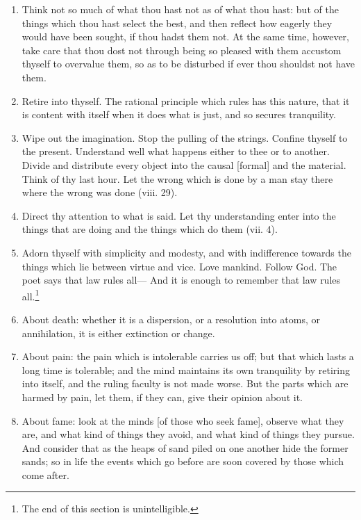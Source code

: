 \begin{enumerate}
\item Think not so much of what thou hast not as of what thou hast: but of the things which thou hast select the best, and then reflect how eagerly they would have been sought, if thou hadst them not. At the same time, however, take care that thou dost not through being so pleased with them accustom thyself to overvalue them, so as to be disturbed if ever thou shouldst not have them.

\item Retire into thyself. The rational principle which rules has this nature, that it is content with itself when it does what is just, and so secures tranquility.

\item Wipe out the imagination. Stop the pulling of the strings. Confine thyself to the present. Understand well what happens either to thee or to another. Divide and distribute every object into the causal [{\clarify formal}] and the material. Think of thy last hour. Let the wrong which is done by a man stay there where the wrong was done (viii. 29).

\item Direct thy attention to what is said. Let thy understanding enter into the things that are doing and the things which do them (vii. 4).

\item Adorn thyself with simplicity and modesty, and with indifference towards the things which lie between virtue and vice. Love mankind. Follow God. The poet says that law rules all— And it is enough to remember that law rules all.\footnote{The end of this section is unintelligible.}

\item About death: whether it is a dispersion, or a resolution into atoms, or annihilation, it is either extinction or change.

\item About pain: the pain which is intolerable carries us off; but that which lasts a long time is tolerable; and the mind maintains its own tranquility by retiring into itself, and the ruling faculty is not made worse. But the parts which are harmed by pain, let them, if they can, give their opinion about it.

\item About fame: look at the minds [{\clarify of those who seek fame}], observe what they are, and what kind of things they avoid, and what kind of things they pursue. And consider that as the heaps of sand piled on one another hide the former sands; so in life the events which go before are soon covered by those which come after.


\end{enumerate}
